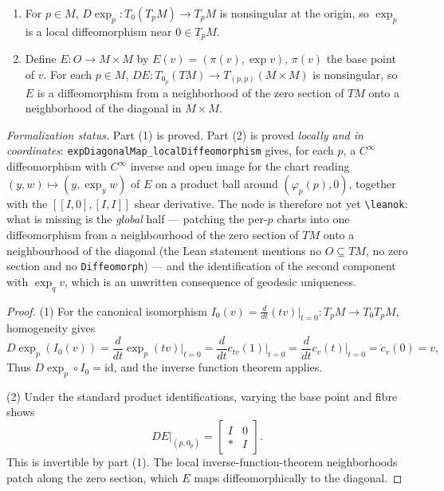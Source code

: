 \begin{proposition}
  \label{prop:pet-ch5-exp-diffeomorphism-properties}

  \begin{enumerate}
  \item For $p\in M$, $D\exp_p:T_0(T_pM)\to T_pM$ is nonsingular at the origin, so
  $\exp_p$ is a local diffeomorphism near $0\in T_pM$.
  \item Define $E:O\to M\times M$ by $E(v)=(\pi(v),\exp v)$, $\pi(v)$ the base point
  of $v$. For each $p\in M$, $DE:T_{0_p}(TM)\to T_{(p,p)}(M\times M)$ is nonsingular,
  so $E$ is a diffeomorphism from a neighborhood of the zero section of $TM$ onto a
  neighborhood of the diagonal in $M\times M$.
  \end{enumerate}

  \emph{Formalization status.} Part (1) is proved. Part (2) is proved
  \emph{locally and in coordinates}: \texttt{expDiagonalMap\_localDiffeomorphism}
  gives, for each $p$, a $C^\infty$ diffeomorphism with $C^\infty$ inverse and open
  image for the chart reading $(y,w)\mapsto(y,\exp_y w)$ of $E$ on a product ball
  around $(\varphi_p(p),0)$, together with the $[[I,0],[I,I]]$ shear derivative.
  The node is therefore not yet \texttt{\textbackslash leanok}: what is missing is
  the \emph{global} half — patching the per-$p$ charts into one diffeomorphism from
  a neighbourhood of the zero section of $TM$ onto a neighbourhood of the diagonal
  (the Lean statement mentions no $O\subseteq TM$, no zero section and no
  \texttt{Diffeomorph}) — and the identification of the second component with
  $\exp_q v$, which is an unwritten consequence of geodesic uniqueness.
\end{proposition}
\begin{proof}
  \sketch
  (1) For the canonical isomorphism
  $I_0(v)=\frac{d}{dt}(tv)|_{t=0}:T_pM\to T_0T_pM$, homogeneity gives
  \[
    D\exp_p(I_0(v))=\frac{d}{dt}\exp_p(tv)\Big|_{t=0}
    =\frac{d}{dt}c_{tv}(1)\Big|_{t=0}=\frac{d}{dt}c_v(t)\Big|_{t=0}=\dot c_v(0)=v,
  \]
  Thus $D\exp_p\circ I_0=\mathrm{id}$, and the inverse function theorem applies.

  (2) Under the standard product identifications, varying the base point and fibre
  shows
  \[
    DE|_{(p,0_p)}=\begin{bmatrix}I&0\\ *&I\end{bmatrix}.
  \]
  This is invertible by part (1).  The local inverse-function-theorem neighborhoods
  patch along the zero section, which $E$ maps diffeomorphically to the diagonal.
\end{proof}

